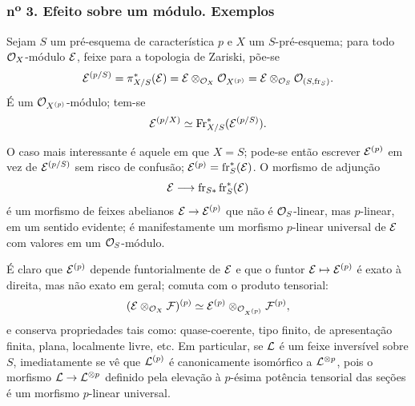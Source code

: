 \subsubsection*{n\textsuperscript{o} 3. Efeito sobre um módulo. Exemplos}

Sejam $S$ um pré-esquema de característica $p$ e $X$ um $S$-pré-esquema; para todo $\mathcal{O}_X$-módulo $\mathcal E$, feixe para a topologia de Zariski, põe-se
\[
\mathcal E^{(p/S)}=\pi_{X/S}^*(\mathcal E)=\mathcal E\otimes_{\mathcal{O}_X}\mathcal{O}_{X^{(p)}}
 =\mathcal E\otimes_{\mathcal{O}_S}\mathcal{O}_{(S,\operatorname{fr}_S)}.
\]
É um $\mathcal{O}_{X^{(p)}}$-módulo; tem-se
\[
\mathcal E^{(p/X)}\simeq \operatorname{Fr}_{X/S}^*(\mathcal E^{(p/S)}).
\]

O caso mais interessante é aquele em que $X=S$; pode-se então escrever $\mathcal E^{(p)}$ em vez de $\mathcal E^{(p/S)}$ sem risco de confusão; $\mathcal E^{(p)}=\operatorname{fr}_S^*(\mathcal E)$. O morfismo de adjunção
\[
\mathcal E\longrightarrow \operatorname{fr}_{S*}\operatorname{fr}_S^*(\mathcal E)
\]
é um morfismo de feixes abelianos $\mathcal E\to\mathcal E^{(p)}$ que não é $\mathcal{O}_S$-linear, mas $p$-linear, em um sentido evidente; é manifestamente um morfismo $p$-linear universal de $\mathcal E$ com valores em um $\mathcal{O}_S$-módulo.

É claro que $\mathcal E^{(p)}$ depende funtorialmente de $\mathcal E$ e que o funtor $\mathcal E\mapsto\mathcal E^{(p)}$ é exato à direita, mas não exato em geral; comuta com o produto tensorial:
\[
(\mathcal E\otimes_{\mathcal{O}_X}\mathcal F)^{(p)}\simeq
\mathcal E^{(p)}\otimes_{\mathcal{O}_{X^{(p)}}}\mathcal F^{(p)},
\]
e conserva propriedades tais como: quase-coerente, tipo finito, de apresentação finita, plana, localmente livre, etc. Em particular, se $\mathcal L$ é um feixe inversível sobre $S$, imediatamente se vê que $\mathcal L^{(p)}$ é canonicamente isomórfico a $\mathcal L^{\otimes p}$, pois o morfismo $\mathcal L\to\mathcal L^{\otimes p}$ definido pela elevação à $p$-ésima potência tensorial das seções é um morfismo $p$-linear universal.
